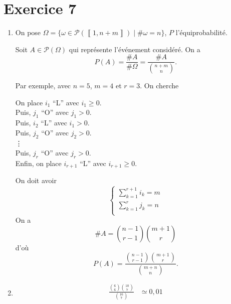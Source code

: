 \part{Exercice 7}


\begin{enumerate}
	\item On pose $\Omega = \big\{ \omega \in \mathcal{P}(\left\llbracket 1,n+m \right\rrbracket)  \mid \#\omega = n \big\}$, $P$ l'équiprobabilité.

		Soit $A \in \mathcal{P}(\Omega)$ qui représente l'événement considéré. On a \[
			P(A) = \frac{\#A}{\#\Omega} = \frac{\#A}{{n+m\choose n}}.
		\]

		Par exemple, avec $n = 5$, $m = 4$ et $r = 3$.
		On cherche 

		On place $i_1$ ``L'' avec $i_1 \ge 0$.\\
		Puis, $j_1$ ``O'' avec $j_1 > 0$.\\
		Puis, $i_2$ ``L'' avec $i_1 > 0$.\\
		Puis, $j_2$ ``O'' avec $j_2 > 0$.\\
		\vdots\\
		Puis, $j_r$ ``O'' avec $j_r > 0$.\\
		Enfin, on place $i_{r+1}$ ``L'' avec $i_{r+1} \ge 0$.

		On doit avoir \[
			\begin{cases}
				\sum_{k=1}^{r+1} i_{k} = m\\
				\sum_{k=1}^{r} j_{k} = n\\
			\end{cases}
		\]
		On a \[
			\#A = {n-1 \choose r - 1}{m +1 \choose r}
		\] d'où \[
			P(A) = \frac{{n-1\choose r-1}{m+1\choose r}}{{m + n \choose n}}.
		\]
	\item \begin{align*}
			\frac{{6 \choose 6}{10 \choose 7}}{{16 \choose 7}} &\simeq 0,\!01 \\
		\end{align*}
\end{enumerate}
